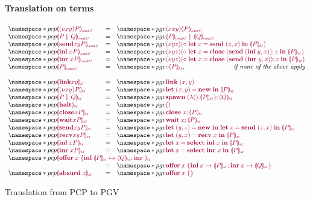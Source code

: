 \begin{figure}[h]
  \paragraph*{Translation on terms}
  \[
  \begin{array}{lcl}
    \pcp{\tm{\cpgvC{\res{x}{y}{P}}}}
    & = & \pgv{\tm{\res{x}{y}{\cpgvC{P}}}} \\
    \pcp{\tm{\cpgvC{\ppar{P}{Q}}}}
    & = & \pgv{\tm{\ppar{\cpgvC{P}}{\cpgvC{Q}}}} \\
    \pcp{\tm{\cpgvC{\send{x}{y}{P}}}}
    & = & \pgv{\tm{\res{y}{z}{(\child\;\letbind{x}{\send\;\pair{z}{x}}{\cpgvM{P}})}}} \\
    \pcp{\tm{\cpgvC{\inl{x}{P}}}}
    & = & \pgv{\tm{\res{y}{z}{(\child\;\letbind{x}{\andthen{\close\;(\send\;\pair{\inl{y}}{x})}{z}}{\cpgvM{P}})}}} \\
    \pcp{\tm{\cpgvC{\inr{x}{P}}}}
    & = & \pgv{\tm{\res{y}{z}{(\child\;\letbind{x}{\andthen{\close\;(\send\;\pair{\inr{y}}{x})}{z}}{\cpgvM{P}})}}} \\
    \pcp{\tm{\cpgvC{P}}}
    & = & \pgv{\tm{\child{\cpgvM{P}}}},\hfill\textit{if none of the above apply}\\
    \\
    \pcp{\tm{\cpgvM{\link{x}{y}}}}
    & = & \pgv{\tm{\link\;{\pair{x}{y}}}} \\
    \pcp{\tm{\cpgvM{\res{x}{y}{P}}}}
    & = & \pgv{\tm{\letpair{x}{y}{\new}{\cpgvM{P}}}} \\
    \pcp{\tm{\cpgvM{\ppar{P}{Q}}}}
    & = & \pgv{\tm{\andthen{\spawn\;{(\lambda\unit.\cpgvM{P})}}{\cpgvM{Q}}}} \\
    \pcp{\tm{\cpgvM{\halt}}}
    & = & \pgv{\tm{\unit}} \\
    \pcp{\tm{\cpgvM{\close{x}{P}}}}
    & = & \pgv{\tm{\andthen{\close\;{x}}{\cpgvM{P}}}} \\
    \pcp{\tm{\cpgvM{\wait{x}{P}}}}
    & = & \pgv{\tm{\andthen{\wait\;{x}}{\cpgvM{P}}}} \\
    \pcp{\tm{\cpgvM{\send{x}{y}{P}}}}
    & = & \pgv{\tm{\letpair{y}{z}{\new}{\letbind{x}{\send\;{\pair{z}{x}}}{\cpgvM{P}}}}} \\
    \pcp{\tm{\cpgvM{\recv{x}{y}{P}}}}
    & = & \pgv{\tm{\letpair{y}{x}{\recv\;{x}}{\cpgvM{P}}}} \\
    \pcp{\tm{\cpgvM{\inl{x}{P}}}}
    & = & \pgv{\tm{\letbind{x}{\select{\labinl}\;{x}}{\cpgvM{P}}}} \\
    \pcp{\tm{\cpgvM{\inr{x}{P}}}}
    & = & \pgv{\tm{\letbind{x}{\select{\labinr}\;{x}}{\cpgvM{P}}}} \\
    \multicolumn{3}{l}{\pcp{\tm{\cpgvM{\offer{x}{\cpgvM{P}}{\cpgvM{Q}}}}}} \\
    & = & \pgv{\tm{\offer{x}{x}{\cpgvM{P}}{x}{\cpgvM{Q}}}} \\
    \pcp{\tm{\cpgvM{\absurd{x}}}}
    & = & \pgv{\tm{\offeremp{x}}}
  \end{array}
  \]
  \caption{Translation from PCP to PGV}
  \label{fig:pcp-to-pgv}
\end{figure}

